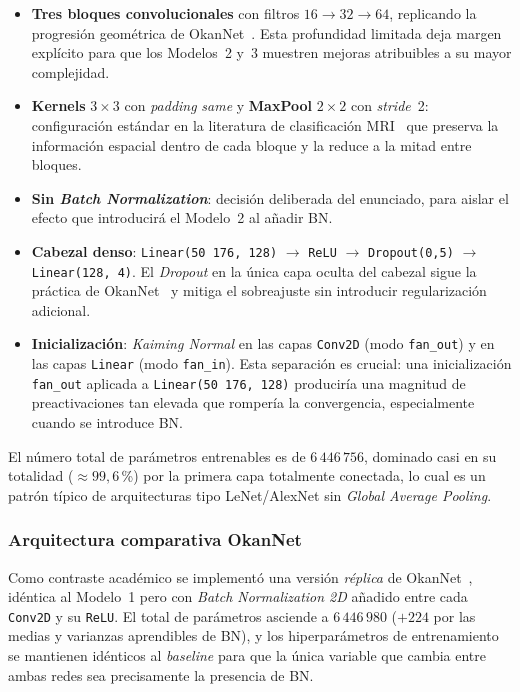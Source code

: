 \begin{itemize}
  \item \textbf{Tres bloques convolucionales} con filtros
        $16{\to}32{\to}64$, replicando la progresión geométrica
        de OkanNet~\cite{okannet2026}. Esta profundidad limitada
        deja margen explícito para que los Modelos~2 y~3
        muestren mejoras atribuibles a su mayor complejidad.
  \item \textbf{Kernels} $3{\times}3$ con \textit{padding}
        \textit{same} y \textbf{MaxPool} $2{\times}2$ con
        \textit{stride}~2: configuración estándar en la
        literatura de clasificación MRI~\cite{gupta2023} que
        preserva la información espacial dentro de cada bloque
        y la reduce a la mitad entre bloques.
  \item \textbf{Sin \textit{Batch Normalization}}: decisión
        deliberada del enunciado, para aislar el efecto que
        introducirá el Modelo~2 al añadir BN.
  \item \textbf{Cabezal denso}: \texttt{Linear(50\,176, 128)}
        $\to$ \texttt{ReLU} $\to$ \texttt{Dropout(0{,}5)} $\to$
        \texttt{Linear(128, 4)}. El \textit{Dropout} en la única
        capa oculta del cabezal sigue la práctica de
        OkanNet~\cite{okannet2026} y mitiga el sobreajuste sin
        introducir regularización adicional.
  \item \textbf{Inicialización}: \textit{Kaiming Normal} en las
        capas \texttt{Conv2D} (modo \texttt{fan\_out}) y en las
        capas \texttt{Linear} (modo \texttt{fan\_in}). Esta
        separación es crucial: una inicialización
        \texttt{fan\_out} aplicada a
        \texttt{Linear(50\,176, 128)} produciría una magnitud
        de preactivaciones tan elevada que rompería la
        convergencia, especialmente cuando se introduce BN.
\end{itemize}

El número total de parámetros entrenables es de $6\,446\,756$,
dominado casi en su totalidad ($\approx 99{,}6$\,\%) por la
primera capa totalmente conectada, lo cual es un patrón típico
de arquitecturas tipo LeNet/AlexNet sin
\textit{Global Average Pooling}.

\subsubsection*{Arquitectura comparativa OkanNet}

Como contraste académico se implementó una versión \emph{réplica}
de OkanNet~\cite{okannet2026}, idéntica al Modelo~1 pero con
\textit{Batch Normalization 2D} añadido entre cada \texttt{Conv2D}
y su \texttt{ReLU}. El total de parámetros asciende a
$6\,446\,980$ ($+224$ por las medias y varianzas aprendibles de
BN), y los hiperparámetros de entrenamiento se mantienen
idénticos al \textit{baseline} para que la única variable que
cambia entre ambas redes sea precisamente la presencia de BN.

